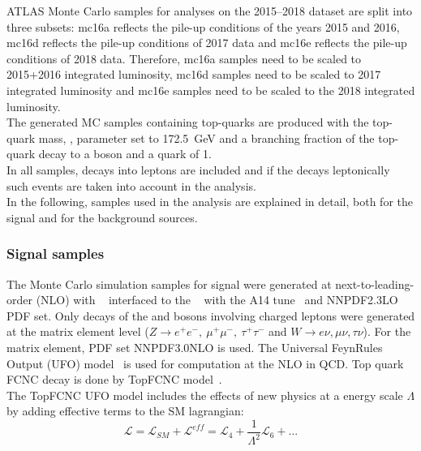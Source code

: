 ATLAS Monte Carlo samples for analyses on the 2015--2018 dataset are split into three subsets: mc16a reflects the pile-up conditions of the years 2015 and 2016, mc16d reflects the pile-up conditions of 2017 data and mc16e reflects the pile-up conditions of 2018 data. Therefore, mc16a samples need to be scaled to 2015+2016 integrated luminosity, mc16d samples need to be scaled to 2017 integrated luminosity and mc16e samples need to be scaled to the 2018 integrated luminosity.\\
The generated MC samples containing top-quarks are produced with the top-quark mass, \mtop,
parameter set to \SI{172.5}{\GeV} and a branching fraction of the top-quark decay to a \PW boson and a \Pqb quark of 1. \\
In all samples, decays into \Pgt leptons are included and if the \Pgt decays leptonically such events are taken into account in the analysis.\\
In the following, samples used in the analysis are explained in detail, both for the signal and for the background sources.

\subsubsection{Signal samples}
\label{sec:samples:mc:sig}

The Monte Carlo simulation samples for signal were generated at next-to-leading-order (NLO) with \aMCatNLO~\cite{Alwall:2014hca} interfaced to the \PythiaEight~\cite{Sjostrand:2007gs} with the \textsc{A14} tune~\cite{Skands:2010ak} and \textsc{NNPDF2.3LO} PDF set. Only decays of the \PW and \PZ bosons involving charged leptons were generated at the matrix element level (\mbox{$Z\to e^+e^-,~\mu^+\mu^-,~\tau^+\tau^-$} and \mbox{$W \to e\nu, \mu\nu, \tau\nu$)}. For the matrix element, PDF set \textsc{NNPDF3.0NLO} is used. The Universal FeynRules Output (UFO) model~\cite{Alloul:2013bka} is used for computation at the NLO in QCD. Top quark FCNC decay is done by TopFCNC model~\cite{Degrande:2014tta,Durieux:2014xla}.\\
The TopFCNC UFO model includes the effects of new physics at a energy scale $\Lambda$ by adding effective terms to the SM lagrangian:
\begin{equation}
\mathcal{L} = \mathcal{L}_{SM} + \mathcal{L}^{eff} = \mathcal{L}_4 + \frac{1}{\Lambda^2} \mathcal{L}_6+ ...
\end{equation}

